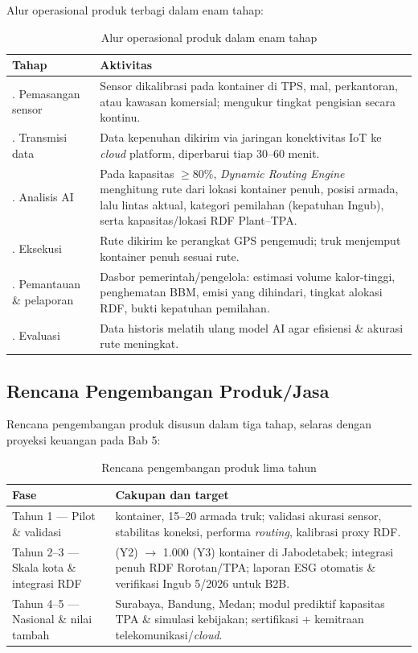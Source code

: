 Alur operasional produk terbagi dalam enam tahap:
\begin{table}[htbp]
\footnotesize
\renewcommand{\arraystretch}{0.85}
\begin{tabularx}{\textwidth}{|>{\RaggedRight\arraybackslash}p{3.0cm}|>{\RaggedRight\arraybackslash}X|}
\hline
\textbf{Tahap} & \textbf{Aktivitas} \\
\hline
1. Pemasangan sensor & Sensor dikalibrasi pada kontainer di TPS, mal, perkantoran, atau kawasan komersial; mengukur tingkat pengisian secara kontinu. \\
\hline
2. Transmisi data & Data kepenuhan dikirim via jaringan konektivitas IoT ke \textit{cloud} platform, diperbarui tiap 30--60 menit. \\
\hline
3. Analisis AI & Pada kapasitas $\geq$80\%, \textit{Dynamic Routing Engine} menghitung rute dari lokasi kontainer penuh, posisi armada, lalu lintas aktual, kategori pemilahan (kepatuhan Ingub), serta kapasitas/lokasi RDF Plant--TPA. \\
\hline
4. Eksekusi & Rute dikirim ke perangkat GPS pengemudi; truk menjemput kontainer penuh sesuai rute. \\
\hline
5. Pemantauan \& pelaporan & Dasbor pemerintah/pengelola: estimasi volume kalor-tinggi, penghematan BBM, emisi yang dihindari, tingkat alokasi RDF, bukti kepatuhan pemilahan. \\
\hline
6. Evaluasi & Data historis melatih ulang model AI agar efisiensi \& akurasi rute meningkat. \\
\hline
\end{tabularx}
\caption{Alur operasional produk \ProductName{} dalam enam tahap}
\end{table}

\subsection{Rencana Pengembangan Produk/Jasa}
\label{sec:2-4}

Rencana pengembangan produk disusun dalam tiga tahap, selaras dengan proyeksi keuangan pada Bab 5:
\begin{table}[htbp]
\footnotesize
\renewcommand{\arraystretch}{0.85}
\begin{tabularx}{\textwidth}{|>{\RaggedRight\arraybackslash}p{3.0cm}|>{\RaggedRight\arraybackslash}X|}
\hline
\textbf{Fase} & \textbf{Cakupan dan target} \\
\hline
Tahun 1 --- Pilot \& validasi & 75 kontainer, 15--20 armada truk; validasi akurasi sensor, stabilitas koneksi, performa \textit{routing}, kalibrasi proxy RDF. \\
\hline
Tahun 2--3 --- Skala kota \& integrasi RDF & 400 (Y2) $\rightarrow$ 1.000 (Y3) kontainer di Jabodetabek; integrasi penuh RDF Rorotan/TPA; laporan ESG otomatis \& verifikasi Ingub 5/2026 untuk B2B. \\
\hline
Tahun 4--5 --- Nasional \& nilai tambah & Surabaya, Bandung, Medan; modul prediktif kapasitas TPA \& simulasi kebijakan; sertifikasi + kemitraan telekomunikasi/\textit{cloud}. \\
\hline
\end{tabularx}
\caption{Rencana pengembangan produk lima tahun \ProductName{}}
\end{table}

